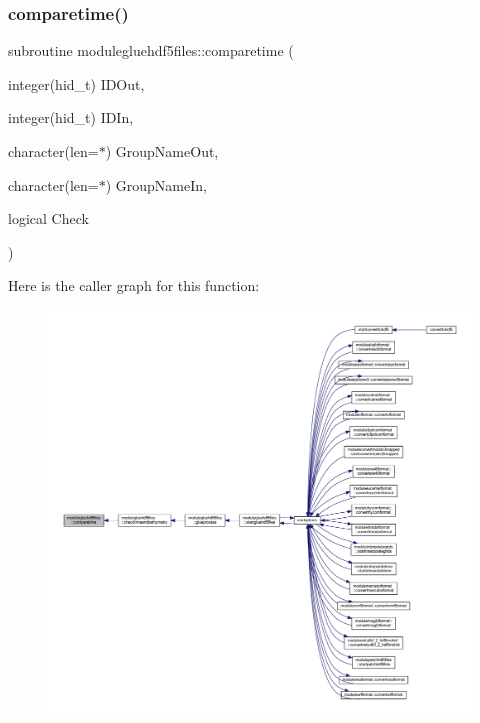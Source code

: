 \subsubsection{\texorpdfstring{comparetime()}{comparetime()}}
{\footnotesize\ttfamily subroutine modulegluehdf5files\+::comparetime (\begin{DoxyParamCaption}\item[{integer(hid\+\_\+t)}]{I\+D\+Out,  }\item[{integer(hid\+\_\+t)}]{I\+D\+In,  }\item[{character(len=$\ast$)}]{Group\+Name\+Out,  }\item[{character(len=$\ast$)}]{Group\+Name\+In,  }\item[{logical}]{Check }\end{DoxyParamCaption})\hspace{0.3cm}{\ttfamily [private]}}

Here is the caller graph for this function\+:\nopagebreak
\begin{figure}[H]
\begin{center}
\leavevmode
\includegraphics[width=350pt]{namespacemodulegluehdf5files_a133e090c390fb1c7e840d7fa26500914_icgraph}
\end{center}
\end{figure}
\mbox{\label{namespacemodulegluehdf5files_a50f42179c2c16aa6c290cd9672da239b}} 
